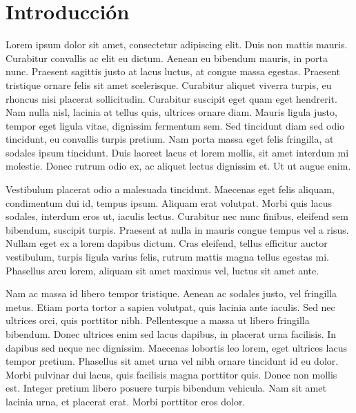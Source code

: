 \chapter{Introducción}

Lorem ipsum dolor sit amet, consectetur adipiscing elit. Duis non mattis mauris. Curabitur convallis ac elit eu dictum. Aenean eu bibendum mauris, in porta nunc. Praesent sagittis justo at lacus luctus, at congue massa egestas. Praesent tristique ornare felis sit amet scelerisque. Curabitur aliquet viverra turpis, eu rhoncus nisi placerat sollicitudin. Curabitur suscipit eget quam eget hendrerit. Nam nulla nisl, lacinia at tellus quis, ultrices ornare diam. Mauris ligula justo, tempor eget ligula vitae, dignissim fermentum sem. Sed tincidunt diam sed odio tincidunt, eu convallis turpis pretium. Nam porta massa eget felis fringilla, at sodales ipsum tincidunt. Duis laoreet lacus et lorem mollis, sit amet interdum mi molestie. Donec rutrum odio ex, ac aliquet lectus dignissim et. Ut ut augue enim.

Vestibulum placerat odio a malesuada tincidunt. Maecenas eget felis aliquam, condimentum dui id, tempus ipsum. Aliquam erat volutpat. Morbi quis lacus sodales, interdum eros ut, iaculis lectus. Curabitur nec nunc finibus, eleifend sem bibendum, suscipit turpis. Praesent at nulla in mauris congue tempus vel a risus. Nullam eget ex a lorem dapibus dictum. Cras eleifend, tellus efficitur auctor vestibulum, turpis ligula varius felis, rutrum mattis magna tellus egestas mi. Phasellus arcu lorem, aliquam sit amet maximus vel, luctus sit amet ante.

Nam ac massa id libero tempor tristique. Aenean ac sodales justo, vel fringilla metus. Etiam porta tortor a sapien volutpat, quis lacinia ante iaculis. Sed nec ultrices orci, quis porttitor nibh. Pellentesque a massa ut libero fringilla bibendum. Donec ultrices enim sed lacus dapibus, in placerat urna facilisis. In dapibus sed neque nec dignissim. Maecenas lobortis leo lorem, eget ultrices lacus tempor pretium. Phasellus sit amet urna vel nibh ornare tincidunt id eu dolor. Morbi pulvinar dui lacus, quis facilisis magna porttitor quis. Donec non mollis est. Integer pretium libero posuere turpis bibendum vehicula. Nam sit amet lacinia urna, et placerat erat. Morbi porttitor eros dolor. 